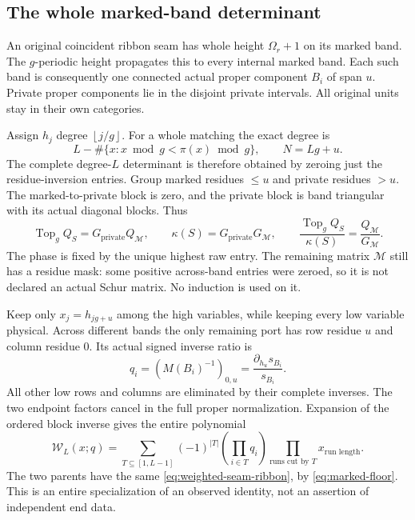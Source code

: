 \documentclass[11pt,a4paper]{amsart}
\numberwithin{equation}{section}
\theoremstyle{plain}
\theoremstyle{definition}
\newcommand{\floor}[1]{\left\lfloor#1\right\rfloor}
\begin{document}
\subsection{The whole marked-band determinant}

An original coincident ribbon seam has whole height \(\Omega_r+1\) on its
marked band.  The \(g\)-periodic height propagates this to every internal
marked band.  Each such band is consequently one connected actual proper
component \(B_i\) of span \(u\).  Private proper components lie in the disjoint
private intervals.  All original units stay in their own categories.

Assign \(h_j\) degree \(\floor{j/g}\).  For a whole matching the exact degree is
\[
 L-\#\{x:x\bmod g<\pi(x)\bmod g\},\qquad N=Lg+u.
\]
The complete degree-\(L\) determinant is therefore obtained by zeroing just
the residue-inversion entries.  Group marked residues \(\le u\) and private
residues \(>u\).  The marked-to-private block is zero, and the private block
is band triangular with its actual diagonal blocks.  Thus
\begin{equation}\label{eq:marked-floor}
 \operatorname{Top}_gQ_S=G_{\mathrm{private}}Q_{\mathcal M},\qquad
 \kappa(S)=G_{\mathrm{private}}G_{\mathcal M},\qquad
 \frac{\operatorname{Top}_gQ_S}{\kappa(S)}
       =\frac{Q_{\mathcal M}}{G_{\mathcal M}}.
\end{equation}
The phase is fixed by the unique highest raw entry.  The remaining matrix
\(\mathcal M\) still has a residue mask: some positive across-band entries
were zeroed, so it is not declared an actual Schur matrix.  No induction
is used on it.

Keep only \(x_j=h_{jg+u}\) among the high variables, while keeping every low
variable physical.  Across different bands the only remaining port has
row residue \(u\) and column residue \(0\).  Its actual signed inverse ratio is
\[
 q_i=(M(B_i)^{-1})_{0,u}
          =\frac{\partial_{h_u}s_{B_i}}{s_{B_i}}.
\]
All other low rows and columns are eliminated by their complete inverses.
The two endpoint factors cancel in the full proper normalization.
Expansion of the ordered block inverse gives the entire polynomial
\begin{equation}\label{eq:weighted-seam-ribbon}
 \mathcal W_L(x;q)=
 \sum_{T\subseteq[1,L-1]}(-1)^{|T|}
       \left(\prod_{i\in T}q_i\right)
       \prod_{\text{runs cut by }T}x_{\text{run length}}.
\end{equation}
The two parents have the same \eqref{eq:weighted-seam-ribbon}, by
\eqref{eq:marked-floor}.  This is an entire specialization of an observed
identity, not an assertion of independent end data.
\end{document}
